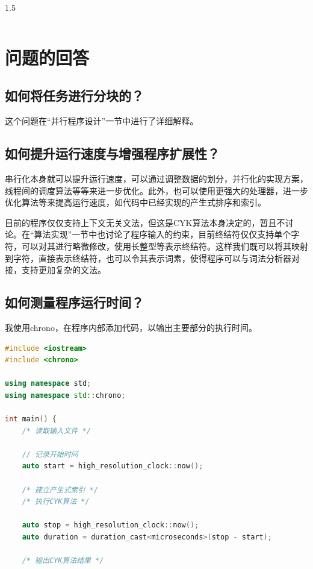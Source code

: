 \documentclass[zihao=-4]{ctexart}
\begin{document}
\begin{spacing}{1.5}
\begin{table}[H]
\begin{tabular}{lrrrrrr}
\hline
\end{tabular} 
\end{table}

\section{问题的回答}

\subsection{如何将任务进行分块的？}

这个问题在“并行程序设计”一节中进行了详细解释。

\subsection{如何提升运行速度与增强程序扩展性？}

串行化本身就可以提升运行速度，可以通过调整数据的划分，并行化的实现方案，线程间的调度算法等等来进一步优化。此外，也可以使用更强大的处理器，进一步优化算法等来提高运行速度，如代码中已经实现的产生式排序和索引。

目前的程序仅仅支持上下文无关文法，但这是CYK算法本身决定的，暂且不讨论。在“算法实现”一节中也讨论了程序输入的约束，目前终结符仅仅支持单个字符，可以对其进行略微修改，使用长整型等表示终结符。这样我们既可以将其映射到字符，直接表示终结符，也可以令其表示词素，使得程序可以与词法分析器对接，支持更加复杂的文法。

\subsection{如何测量程序运行时间？}

我使用chrono，在程序内部添加代码，以输出主要部分的执行时间。

\begin{lstlisting}[language=C++,title={时间记录代码}]
#include <iostream>
#include <chrono>

using namespace std;
using namespace std::chrono;

int main() {
    /* 读取输入文件 */

    // 记录开始时间
    auto start = high_resolution_clock::now();

    /* 建立产生式索引 */
    /* 执行CYK算法 */
    
    auto stop = high_resolution_clock::now();
    auto duration = duration_cast<microseconds>(stop - start);

    /* 输出CYK算法结果 */


\end{lstlisting}
\end{spacing}
\end{document}
